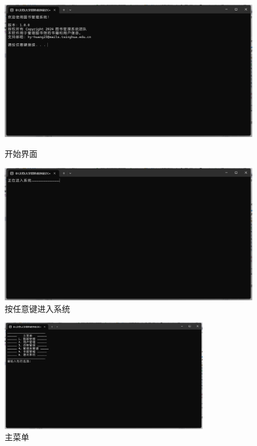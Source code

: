 \documentclass[12pt,twoside]{ctexart}
\begin{document}
\begin{figure}[H]
    \centering
    \begin{minipage}{0.48\textwidth}
        \centering
        \includegraphics[width=\linewidth]{Begining.png}
        \caption{开始界面}
    \end{minipage}\hfill
    \begin{minipage}{0.48\textwidth}
        \centering
        \includegraphics[width=\linewidth]{Starting.png}
        \caption{按任意键进入系统}
    \end{minipage}
\end{figure}

\begin{figure}[H]
    \centering
    \includegraphics[width=0.8\textwidth]{Main.png}
    \caption{主菜单}
\end{figure}
\end{document}
